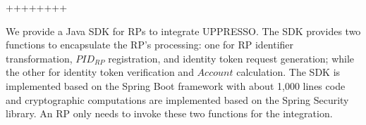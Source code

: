 


++++++++ 

We provide a Java SDK for RPs to integrate UPPRESSO.
The SDK provides two functions to encapsulate the RP's processing: one for RP identifier transformation, $PID_{RP}$ registration, and identity token request generation; while the other for identity token verification and $Account$ calculation. %
The SDK is implemented based on the Spring Boot framework  with about 1,000 lines code and cryptographic computations are implemented based on the Spring Security library.
An RP only needs to invoke these two functions for the integration.


